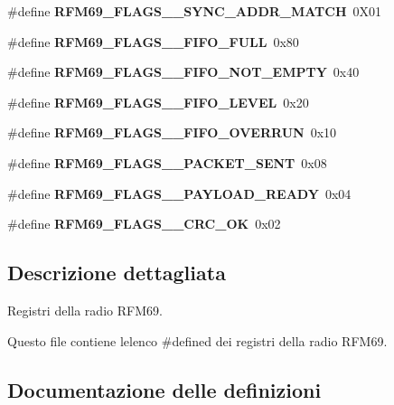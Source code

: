 \begin{DoxyCompactItemize}
\mbox{\label{_r_f_m69__registri_8h_af538166541e9e3f1a71b5ac22504f524}} 
\#define {\bfseries R\+F\+M69\+\_\+\+F\+L\+A\+G\+S\+\_\+\_\+\+S\+Y\+N\+C\+\_\+\+A\+D\+D\+R\+\_\+\+M\+A\+T\+CH}~0\+X01
\item 
\mbox{\label{_r_f_m69__registri_8h_a797c2a094562d12ba3a5d58d454715a0}} 
\#define {\bfseries R\+F\+M69\+\_\+\+F\+L\+A\+G\+S\+\_\+\_\+\+F\+I\+F\+O\+\_\+\+F\+U\+LL}~0x80
\item 
\mbox{\label{_r_f_m69__registri_8h_a6c97c528d8d8309d089f37189ef05b8f}} 
\#define {\bfseries R\+F\+M69\+\_\+\+F\+L\+A\+G\+S\+\_\+\_\+\+F\+I\+F\+O\+\_\+\+N\+O\+T\+\_\+\+E\+M\+P\+TY}~0x40
\item 
\mbox{\label{_r_f_m69__registri_8h_a1690814f23a15e38166320f828083456}} 
\#define {\bfseries R\+F\+M69\+\_\+\+F\+L\+A\+G\+S\+\_\+\_\+\+F\+I\+F\+O\+\_\+\+L\+E\+V\+EL}~0x20
\item 
\mbox{\label{_r_f_m69__registri_8h_a7915c99e7d7db4d24ce5ae6003f4db9b}} 
\#define {\bfseries R\+F\+M69\+\_\+\+F\+L\+A\+G\+S\+\_\+\_\+\+F\+I\+F\+O\+\_\+\+O\+V\+E\+R\+R\+UN}~0x10
\item 
\mbox{\label{_r_f_m69__registri_8h_aac6b8b9fd280707021bc13ff26231bed}} 
\#define {\bfseries R\+F\+M69\+\_\+\+F\+L\+A\+G\+S\+\_\+\_\+\+P\+A\+C\+K\+E\+T\+\_\+\+S\+E\+NT}~0x08
\item 
\mbox{\label{_r_f_m69__registri_8h_a4e9e9fb026399eafdce7202628c1bf94}} 
\#define {\bfseries R\+F\+M69\+\_\+\+F\+L\+A\+G\+S\+\_\+\_\+\+P\+A\+Y\+L\+O\+A\+D\+\_\+\+R\+E\+A\+DY}~0x04
\item 
\mbox{\label{_r_f_m69__registri_8h_afe6a5e2bc80ab940badac1cba44c5dc1}} 
\#define {\bfseries R\+F\+M69\+\_\+\+F\+L\+A\+G\+S\+\_\+\_\+\+C\+R\+C\+\_\+\+OK}~0x02
\end{DoxyCompactItemize}


\subsection{Descrizione dettagliata}
Registri della radio R\+F\+M69. 

Questo file contiene l\textquotesingle{}elenco {\ttfamily \#define}d dei registri della radio R\+F\+M69. 

\subsection{Documentazione delle definizioni}
\mbox{\label{_r_f_m69__registri_8h_adc910d7ae870ed0e23e4ca135e79392c}} 
